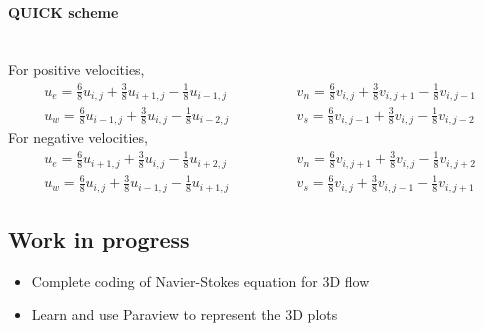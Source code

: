 \documentclass[12pt,a4paper,fleqn]{article}
\begin{document}
\paragraph{QUICK scheme}\mbox{}\\
For positive velocities,
\begin{equation*}
\begin{aligned}
u_e = \tfrac{6}{8}u_{i,j} + \tfrac{3}{8}u_{i+1,j} - \tfrac{1}{8}u_{i-1,j}\\
u_w = \tfrac{6}{8}u_{i-1,j} + \tfrac{3}{8}u_{i,j} - \tfrac{1}{8}u_{i-2,j}
\end{aligned}
\qquad\qquad
\begin{aligned}
v_n = \tfrac{6}{8}v_{i,j} + \tfrac{3}{8}v_{i,j+1} - \tfrac{1}{8}v_{i,j-1}\\
v_s = \tfrac{6}{8}v_{i,j-1} + \tfrac{3}{8}v_{i,j} - \tfrac{1}{8}v_{i,j-2}
\end{aligned}
\end{equation*}
For negative velocities,
\begin{equation*}
\begin{aligned}
u_e = \tfrac{6}{8}u_{i+1,j} + \tfrac{3}{8}u_{i,j} - \tfrac{1}{8}u_{i+2,j}\\
u_w = \tfrac{6}{8}u_{i,j} + \tfrac{3}{8}u_{i-1,j} - \tfrac{1}{8}u_{i+1,j}
\end{aligned}
\qquad\qquad
\begin{aligned}
v_n = \tfrac{6}{8}v_{i,j+1} + \tfrac{3}{8}v_{i,j} - \tfrac{1}{8}v_{i,j+2}\\
v_s = \tfrac{6}{8}v_{i,j} + \tfrac{3}{8}v_{i,j-1} - \tfrac{1}{8}v_{i,j+1}
\end{aligned}
\end{equation*}

\subsection{Work in progress}
\begin{itemize}
    \item Complete coding of Navier-Stokes equation for 3D flow
    \item Learn and use Paraview to represent the 3D plots
    
\end{itemize}
\end{document}
